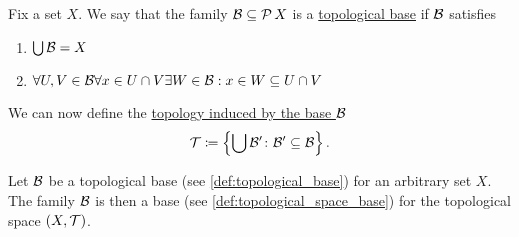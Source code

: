 \begin{definition}\label{def:topological_base}\cite[23]{Lectures:general_topology}
  Fix a set $X$. We say that the family $\mathcal B \subseteq \operatorname{\mathcal P}{X}$ is a \uline{topological base} if $\mathcal B$ satisfies
  \begin{enumerate}[label={\textbf{B\arabic*)}}]
    \item\label{def:topological_base/B1} $\bigcup \mathcal B = X$
    \item\label{def:topological_base/B2} $\forall U, V \in \mathcal B \forall x \in U \cap V \exists W \in \mathcal B: x \in W \subseteq U \cap V$
  \end{enumerate}

  We can now define the \uline{topology induced by the base $\mathcal B$}
  \begin{align*}
    \mathcal T \coloneqq \left\{ \bigcup \mathcal B' \colon \mathcal B' \subseteq \mathcal B \right\}.
  \end{align*}
\end{definition}

\begin{proposition}\label{thm:topological_base_is_topological_space_base}
  Let $\mathcal B$ be a topological base (see \cref{def:topological_base}) for an arbitrary set $X$. The family $\mathcal B$ is then a base (see \cref{def:topological_space_base}) for the topological space $(X, \mathcal T)$.
\end{proposition}
